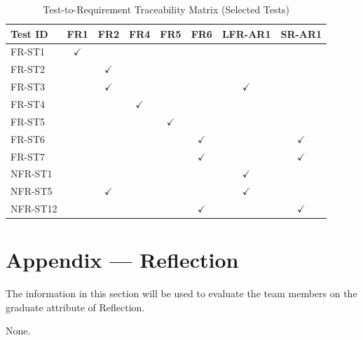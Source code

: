 \documentclass[12pt, titlepage]{article}
\begin{document}
\begin{table}[H]
\centering
\caption{Test-to-Requirement Traceability Matrix (Selected Tests)}
\label{table:trace-matrix}
\small
\begin{tabular}{|l|c|c|c|c|c|c|c|}
\hline
\textbf{Test ID} & \textbf{FR1} & \textbf{FR2} & \textbf{FR4} & \textbf{FR5} & \textbf{FR6} & \textbf{LFR-AR1} & \textbf{SR-AR1} \\
\hline
FR-ST1  & $\checkmark$ & & & & & & \\
FR-ST2  & & $\checkmark$ & & & & & \\
FR-ST3  & & $\checkmark$ & & & & $\checkmark$ & \\
FR-ST4  & & & $\checkmark$ & & & & \\
FR-ST5  & & & & $\checkmark$ & & & \\
FR-ST6  & & & & & $\checkmark$ & & $\checkmark$ \\
FR-ST7  & & & & & $\checkmark$ & & $\checkmark$ \\
NFR-ST1 & & & & & & $\checkmark$ & \\
NFR-ST5 & & $\checkmark$ & & & & $\checkmark$ & \\
NFR-ST12 & & & & & $\checkmark$ & & $\checkmark$ \\
\hline
\end{tabular}
\end{table}
\newpage{}
\section*{Appendix --- Reflection}

The information in this section will be used to evaluate the team members on the
graduate attribute of Reflection.


None.
\end{document}
